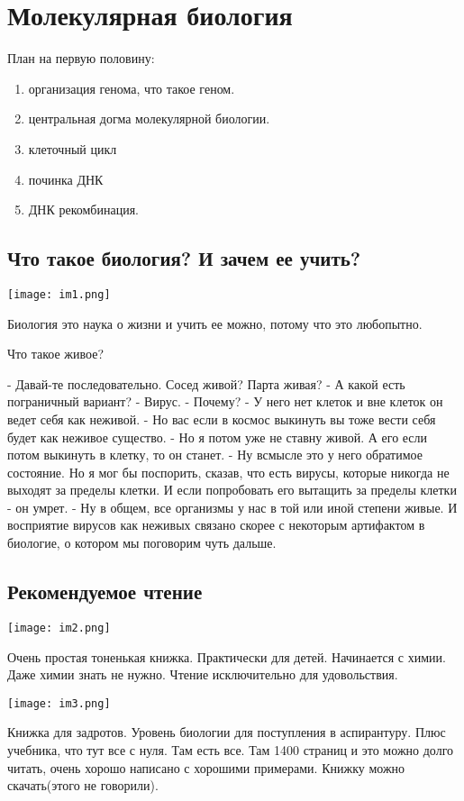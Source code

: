 ﻿\chapter{Молекулярная биология}
План на первую половину: 
\begin{enumerate}
\item организация генома, что такое геном. 
\item центральная догма молекулярной биологии.
\item клеточный цикл
\item починка ДНК
\item ДНК рекомбинация. 
\end{enumerate}

\section{Что такое биология? И зачем ее учить?}

\texttt{[image: im1.png]}

Биология это наука о жизни и учить ее можно, потому
что это любопытно.

Что такое живое?

- Давай-те последовательно. Сосед живой? Парта живая?
- А какой есть пограничный вариант? 
- Вирус. 
- Почему? 
- У него нет клеток и вне клеток он ведет себя как 
неживой. 
- Но вас если в космос выкинуть вы тоже вести себя будет как 
неживое существо. 
- Но я потом уже не ставну живой. А его если потом
выкинуть в клетку, то он станет.
- Ну всмысле это у него обратимое состояние. Но я
мог бы поспорить, сказав, что есть вирусы,
которые никогда не выходят за пределы клетки. И
если попробовать его вытащить за пределы клетки - он умрет.
- Ну в общем, все организмы у нас в той или иной степени живые. 
И восприятие вирусов как неживых связано скорее с некоторым артифактом
в биологие, о котором мы поговорим чуть дальше. 

\section{Рекомендуемое чтение}
\texttt{[image: im2.png]}

Очень простая тоненькая книжка. Практически для детей. Начинается 
с химии. Даже химии знать не нужно. Чтение исключительно для 
удовольствия. 

\texttt{[image: im3.png]}

Книжка для задротов. Уровень биологии для поступления в аспирантуру.
Плюс учебника, что тут все с нуля. Там есть все. Там 1400 страниц
и это можно долго читать, очень хорошо написано с хорошими примерами.
Книжку можно скачать(этого не говорили).   

